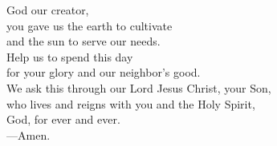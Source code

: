 \prayer


\begin{prayerverse}
God our creator,\\
you gave us the earth to cultivate\\
and the sun to serve our needs.\\
Help us to spend this day\\
for your glory and our neighbor’s good.\\
We ask this through our Lord Jesus Christ, your Son,\\
who lives and reigns with you and the Holy Spirit,\\
God, for ever and ever.\\
{\color{red}---\thinspace}Amen.
\end{prayerverse}

